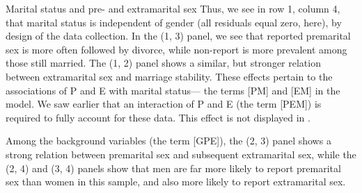 \begin{Example}[marital2]{Marital status and pre- and extramarital sex}
Thus, we see in row 1, column 4, that marital status is independent
of gender (all residuals equal zero, here), by design of the data
collection.  In the (1, 3) panel, we see that reported premarital sex
is more often followed by divorce, while non-report is more prevalent
among those still married.  The (1, 2) panel shows a similar, but stronger relation between extramarital sex and marriage stability.  These
effects pertain to the associations of P and E with marital status---%
the terms [PM] and [EM] in the \loglin{} model.  We saw earlier that
an interaction of P and E (the term [PEM]) is required to fully account for these data.  This effect is not displayed in .

Among the background variables (the \loglin{} term [GPE]), the (2, 3) panel shows a strong relation
between premarital sex and subsequent extramarital sex, while
the (2, 4) and (3, 4) panels show that men are far more likely to report
premarital sex than women in this sample, and also more likely to
report extramarital sex.
\end{Example}

